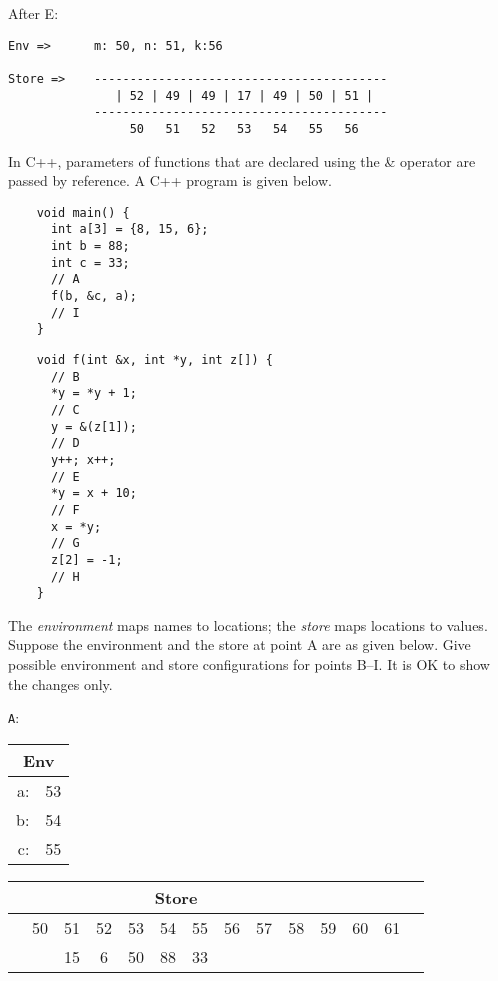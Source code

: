 \documentclass[addpoints]{exam}
\begin{document}
\begin{questions}
\begin{solution}
After E:
{\small
\begin{verbatim}
Env =>      m: 50, n: 51, k:56

Store =>    -----------------------------------------
               | 52 | 49 | 49 | 17 | 49 | 50 | 51 |  
            -----------------------------------------
                 50   51   52   53   54   55   56   
\end{verbatim}}
  \end{solution}

  \newpage
  \question
  In C++, parameters of functions that are declared using the \& operator are passed by reference.
  A C++ program is given below.

  {\small
    \begin{minipage}[t]{0.30\textwidth}
    \begin{verbatim}
    void main() {
      int a[3] = {8, 15, 6};
      int b = 88;
      int c = 33;
      // A
      f(b, &c, a);
      // I
    }
    \end{verbatim}
    \end{minipage}
    \begin{minipage}[t]{0.40\textwidth}
    \begin{verbatim}
    void f(int &x, int *y, int z[]) {
      // B
      *y = *y + 1;
      // C
      y = &(z[1]);
      // D
      y++; x++;
      // E
      *y = x + 10;
      // F
      x = *y;
      // G
      z[2] = -1;
      // H
    }
    \end{verbatim}
    \end{minipage}
  }

  The \emph{environment} maps names to locations;
  the \emph{store} maps locations to values. 
  Suppose the environment and the store at point A are as given below.
  Give possible environment and store configurations for points B--I.
  It is OK to show the changes only.
  
  \texttt{A}:  
  \begin{tabular}{|r c|}
    \multicolumn{2}{c}{Env}\\\hline
    a: & 53 \\
    b: & 54 \\
    c: & 55 \\
    \hline
  \end{tabular}
  \hspace{1cm}
  \begin{tabular}{c|c|c|c|c|c|c|c|c|c|c|c|c|c}
    \multicolumn{11}{c}{Store}\\
    \hline
    \multicolumn{1}{c}{} & \multicolumn{1}{c}{50} & \multicolumn{1}{c}{51} & \multicolumn{1}{c}{52}
    & \multicolumn{1}{c}{53} & \multicolumn{1}{c}{54} & \multicolumn{1}{c}{55}
    & \multicolumn{1}{c}{56} & \multicolumn{1}{c}{57} & \multicolumn{1}{c}{58}
    & \multicolumn{1}{c}{59} & \multicolumn{1}{c}{60} & \multicolumn{1}{c}{61} & \\\hline
    &  \bigstrut 8 &  15 &  6 & 50 & 88 & 33 &  &  &  &  &  &  \\[1ex]\hline
  \end{tabular}
  \hfill
  \strut
  \vspace{0.1cm}
  

\end{questions}
\end{document}
